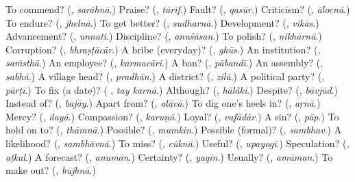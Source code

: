 \begin{tcolorbox}[breakable,colback=teal!4,colframe=teal!35!black,title={Before you move on}]
To commend? (\textbf{}, \emph{sarāhnā}.) Praise? (\textbf{}, \emph{tārīf}.) Fault? (\textbf{}, \emph{qasūr}.) Criticism? (\textbf{}, \emph{ālocnā}.) To endure? (\textbf{}, \emph{jhelnā}.) To get better? (\textbf{}, \emph{sudharnā}.) Development? (\textbf{}, \emph{vikās}.) Advancement? (\textbf{}, \emph{unnati}.) Discipline? (\textbf{}, \emph{anuśāsan}.) To polish? (\textbf{}, \emph{nikhārnā}.) Corruption? (\textbf{}, \emph{bhraṣṭācār}.) A bribe (everyday)? (\textbf{}, \emph{ghūs}.) An institution? (\textbf{}, \emph{saṁsthā}.) An employee? (\textbf{}, \emph{karmacārī}.) A ban? (\textbf{}, \emph{pābandī}.) An assembly? (\textbf{}, \emph{sabhā}.) A village head? (\textbf{}, \emph{pradhān}.) A district? (\textbf{}, \emph{zilā}.) A political party? (\textbf{}, \emph{pārṭī}.) To fix (a date)? (\textbf{ }, \emph{tay karnā}.) Although? (\textbf{}, \emph{hālā̃ki}.) Despite? (\textbf{}, \emph{bāvjūd}.) Instead of? (\textbf{}, \emph{bajāy}.) Apart from? (\textbf{}, \emph{alāvā}.) To dig one's heels in? (\textbf{}, \emph{aṛnā}.) Mercy? (\textbf{}, \emph{dayā}.) Compassion? (\textbf{}, \emph{karuṇā}.) Loyal? (\textbf{}, \emph{vafādār}.) A sin? (\textbf{}, \emph{pāp}.) To hold on to? (\textbf{}, \emph{thāmnā}.) Possible? (\textbf{}, \emph{mumkin}.) Possible (formal)? (\textbf{}, \emph{sambhav}.) A likelihood? (\textbf{}, \emph{sambhāvnā}.) To miss? (\textbf{}, \emph{cūknā}.) Useful? (\textbf{}, \emph{upayogī}.) Speculation? (\textbf{}, \emph{aṭkal}.) A forecast? (\textbf{}, \emph{anumān}.) Certainty? (\textbf{}, \emph{yaqīn}.) Usually? (\textbf{}, \emph{amūman}.) To make out? (\textbf{}, \emph{būjhnā}.)
\end{tcolorbox}
